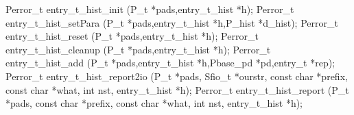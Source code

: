 \begin{code}
Perror\_t entry\_t\_hist\_init (P\_t *pads,entry\_t\_hist *h);
Perror\_t entry\_t\_hist\_setPara (P\_t *pads,entry\_t\_hist *h,P_hist *d_hist);
Perror\_t entry\_t\_hist\_reset (P\_t *pads,entry\_t\_hist *h);
Perror\_t entry\_t\_hist\_cleanup (P\_t *pads,entry\_t\_hist *h);
Perror\_t entry\_t\_hist\_add (P\_t *pads,entry\_t\_hist *h,Pbase\_pd
*pd,entry\_t *rep);
Perror\_t entry\_t\_hist\_report2io (P\_t *pads, Sfio\_t *ourstr,
const char *prefix, const char *what, int nst, entry\_t\_hist *h); 
Perror\_t entry\_t\_hist\_report (P\_t *pads, const char *prefix,
const char *what, int nst, entry\_t\_hist *h);
\end{code}
